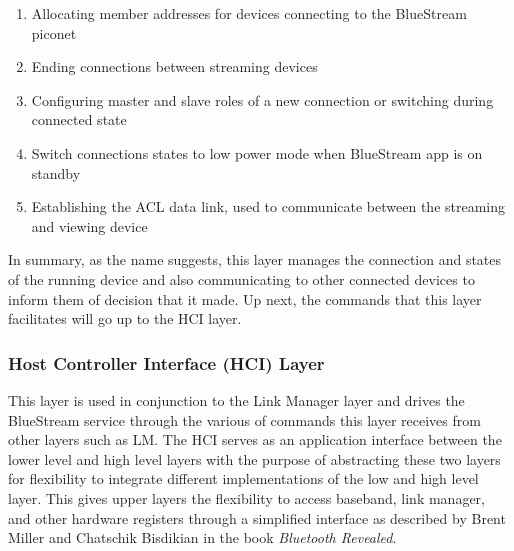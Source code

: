 \documentclass[a4paper,12pt]{article}
\begin{document}
\begin{enumerate}
\item Allocating member addresses for devices connecting to the BlueStream piconet
\item Ending connections between streaming devices
\item Configuring master and slave roles of a new connection or switching during connected state
\item Switch connections states to low power mode when BlueStream app is on standby
\item Establishing the ACL data link, used to communicate between the streaming and viewing device
\end{enumerate}

In summary, as the name suggests, this layer manages the connection and states of the running device and also communicating to other connected devices to inform them of decision that it made. Up next, the commands that this layer facilitates will go up to the HCI layer.

\subsubsection{Host Controller Interface (HCI) Layer}
This layer is used in conjunction to the Link Manager layer and drives the BlueStream service through the various of commands this layer receives from other layers such as LM. The HCI serves as an application interface between the lower level and high level layers with the purpose of abstracting these two layers for flexibility to integrate different implementations of the low and high level layer. This gives upper layers the flexibility to access baseband, link manager, and other hardware registers through a simplified interface as described by Brent Miller and Chatschik Bisdikian in the book \textit{Bluetooth Revealed}.
\end{document}
